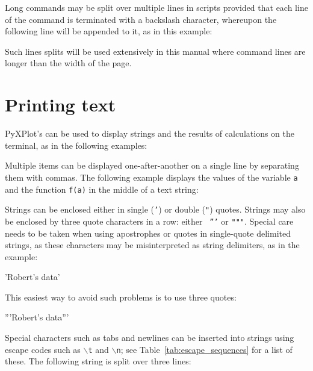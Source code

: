 Long commands may be split over multiple lines in scripts provided that each
line of the command is terminated with a backslash character, whereupon the
following line will be appended to it, as in this example:

\vspace{3mm}

\vspace{3mm}

\noindent Such lines splits will be used extensively in this manual where
command lines are longer than the width of the page.

\section{Printing text}

PyXPlot's  can be used to display strings and the results of
calculations on the terminal, as in the following examples:

\vspace{3mm}

\vspace{3mm}

Multiple items can be displayed one-after-another on a single line by
separating them with commas. The following example displays the values of the
variable {\tt a} and the function {\tt f(a)} in the middle of a text string:

\vspace{3mm}

\vspace{3mm}

Strings can be enclosed either in single ({\tt '}) or double ({\tt "}) quotes.
Strings may also be enclosed by three quote characters in a row: either {\tt
'''} or {\tt """}. Special care needs to be taken when using apostrophes or
quotes in single-quote delimited strings, as these characters may be
misinterpreted as string delimiters, as in the example:

\begin{dontdo}
'Robert's data'
\end{dontdo}

\noindent This easiest way to avoid such problems is to use three quotes:

\begin{dodo}
'''Robert's data'''
\end{dodo}

Special characters such as tabs and newlines can be inserted into strings using
escape codes such as {\tt $\backslash$t} and {\tt $\backslash$n}; see
Table~\ref{tab:escape_sequences} for a list of these. The following string is
split over three lines:

